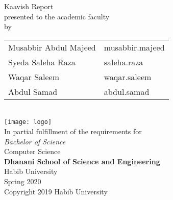 \begin{titlepage}
  \begin{center}
    \vfill
    \textbf{\Huge \Title}
    \bigskip

    {\large Kaavish Report\\
      presented to the academic faculty\\
      by\\
      \begin{tabular}{ll}
        Musabbir Abdul Majeed & musabbir.majeed\\
        Syeda Saleha Raza & saleha.raza\\
        Waqar Saleem & waqar.saleem\\
        Abdul Samad & abdul.samad\\
      \end{tabular}
    }\\\vfill
    \texttt{[image: logo]}\\
    {\large In partial fulfillment of the requirements for\\
      \textit{Bachelor of Science}\\
      Computer Science\\\medskip
      \textbf{Dhanani School of Science and Engineering}\\\medskip
      Habib University\\\smallskip
      Spring 2020
    }\\\vfill
    Copyright {\scriptsize \textcopyright} 2019 Habib University
  \end{center}
\end{titlepage}
